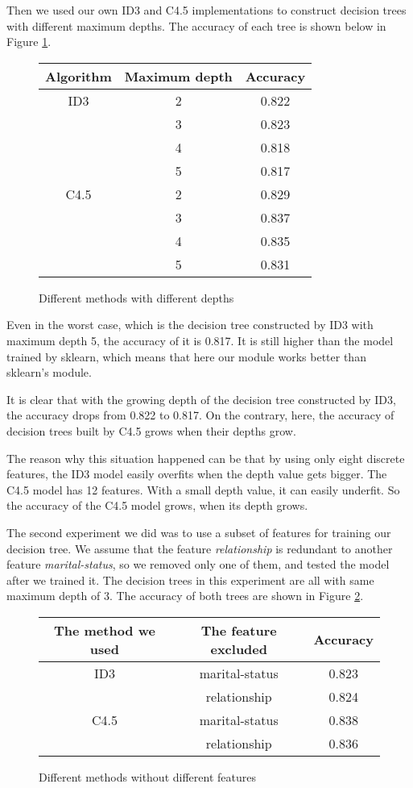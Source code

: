 \documentclass[a4paper]{article}
\begin{document}
Then we used our own ID3 and C4.5 implementations to construct decision trees with different maximum depths. The accuracy of each tree is shown below in Figure \ref{fig:id3c45all}.
\begin{figure}[h]
\centering
    \begin{tabular}{c|c|c}
       Algorithm & Maximum depth & Accuracy \\
        \hline
        ID3 &2& 0.822\\
        & 3 & 0.823\\
        & 4& 0.818\\
        & 5& 0.817\\
        \hline
        C4.5 &2& 0.829\\
        &3 & 0.837\\
        &4 & 0.835\\
        &5 & 0.831\\
     \end{tabular}
     \caption{Different methods with different depths}
     \label{fig:id3c45all}
\end{figure}

Even in the worst case, which is the decision tree constructed by ID3 with maximum depth 5, the accuracy of it is 0.817. It is still higher than the model trained by sklearn, which means that here our module works better than sklearn's module.

It is clear that with the growing depth of the decision tree constructed by ID3, the accuracy drops from 0.822 to 0.817. On the contrary, here, the accuracy of decision trees built by C4.5 grows when their depths grow.

The reason why this situation happened can be that by using only eight discrete features, the ID3 model easily overfits when the depth value gets bigger. The C4.5 model has 12 features. With a small depth value, it can easily underfit. So the accuracy of the C4.5 model grows, when its depth grows.

The second experiment we did was to use a subset of features for training our decision tree. We assume that the feature \emph{relationship} is redundant to another feature \emph{marital-status}, so we removed only one of them, and tested the model after we trained it. The decision trees in this experiment are all with same maximum depth of 3. The accuracy of both trees are shown in Figure \ref{fig:id3c45second}.

\begin{figure}[h]
    \centering
    	\begin{tabular}{c|c|c}
        The method we used & The feature excluded & Accuracy \\
        \hline
        ID3 &marital-status& 0.823\\
        & relationship & 0.824\\
        \hline
        C4.5 &marital-status& 0.838\\
        &relationship &0.836\\
        \end{tabular}
    \caption{Different methods without different features}
    \label{fig:id3c45second}
 \end{figure}
\end{document}
